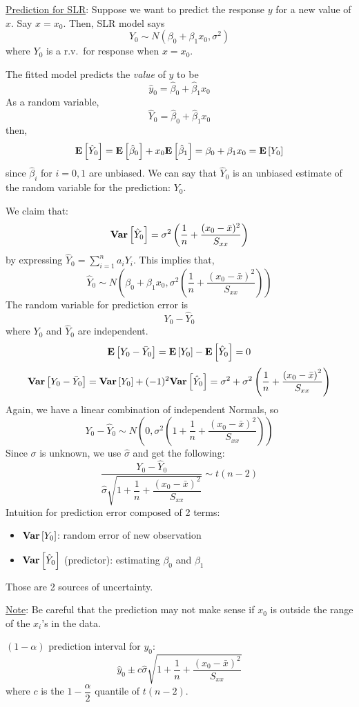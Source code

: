 \underline{Prediction for SLR}: Suppose
we want to predict the response $ y $
for a new value of $ x $. Say $ x=x_0 $. Then,
SLR model says
\[ Y_0 \sim N(\beta_0+\beta_1 x_0,\sigma^2) \]
where $ Y_0 $ is a r.v.\ for response when $ x=x_0 $.

The fitted model predicts the \emph{value} of $ y $
to be
\[ \hat{y}_0=\hat{\beta}_0+\hat{\beta}_1x_0 \]
As a random variable,
\[ \hat{Y}_0=\hat{\beta}_0+\hat{\beta}_1x_0 \]
then,
\[ \bm{\mathrm{E}}\left[\hat{Y}_0\right]=\bm{\mathrm{E}}\left[\hat{\beta}_0\right]+x_0\bm{\mathrm{E}}\left[\hat{\beta}_1\right]=
    \beta_0+\beta_1x_0=\bm{\mathrm{E}}\left[Y_0\right] \]
since $ \hat{\beta}_i $ for $ i=0,1 $ are unbiased.
We can say that $ \hat{Y}_0 $ is an unbiased estimate
of the random variable for the prediction: $ Y_0 $.

We claim that:
\[  \bm{\mathrm{Var}}\left[\hat{Y}_0\right]=\sigma^2\left( \frac{1}{n} +\frac{(x_0-\bar{x})^2}{S_{xx}}  \right) \]
by expressing $ \hat{Y}_0=\sum\limits_{i=1}^{n} a_i Y_i $. This implies
that,
\[ \hat{Y}_0 \sim N\left( \beta_0+\beta_1x_0,
    \sigma^2\left( \frac{1}{n} +\frac{\left( x_0-\bar{x} \right)^2}{S_{xx}}  \right) \right) \]
The random variable for prediction error is
\[ Y_0-\hat{Y}_0 \]
where $ Y_0 $ and $ \hat{Y}_0 $ are independent.
\[ \bm{\mathrm{E}}\left[Y_0-\bar{Y}_0\right]=\bm{\mathrm{E}}\left[Y_0\right]-\bm{\mathrm{E}}\left[\hat{Y}_0\right]=0 \]
\[ \bm{\mathrm{Var}}\left[Y_0-\bar{Y}_0\right]=\bm{\mathrm{Var}}\left[Y_0\right]+(-1)^2\bm{\mathrm{Var}}\left[\hat{Y}_0\right]
    =\sigma^2+\sigma^2\left( \frac{1}{n} +\frac{\left( x_0-\bar{x} \right)^2}{S_{xx}} \right)
\]
Again, we have a linear combination of independent Normals, so
\[ Y_0-\hat{Y}_0
    \sim N\left( 0,\sigma^2\left( 1+\frac{1}{n}+\frac{\left( x_0-\bar{x} \right)^2}{S_{xx}}  \right) \right) \]
Since $ \sigma $ is unknown, we use $ \hat{\sigma} $ and get the following:
\[ \frac{Y_0-\hat{Y}_0}{
        \hat{\sigma}\sqrt{1+\dfrac{1}{n}+\dfrac{(x_0-\bar{x})^2}{S_{xx}}}
    } \sim t(n-2) \]
Intuition for prediction error composed of 2 terms:
\begin{itemize}
    \item $ \bm{\mathrm{Var}}\left[Y_0\right] $: random error of new observation
    \item $ \bm{\mathrm{Var}}\left[\hat{Y}_0\right] $ (predictor): estimating $ \beta_0 $ and $ \beta_1 $
\end{itemize}
Those are 2 sources of uncertainty.

\underline{Note}: Be careful that the prediction may not make sense if
$ x_0 $ is outside the range of the $ x_i $'s in the data.

$ (1-\alpha) $ prediction interval for $ y_0 $:
\[ \hat{y}_0\pm c \hat{\sigma}\sqrt{1+\dfrac{1}{n}+\dfrac{(x_0-\bar{x})^2}{S_{xx}}}
\]
where $ c $ is the $ 1-\dfrac{\alpha}{2} $ quantile of $ t(n-2) $.


